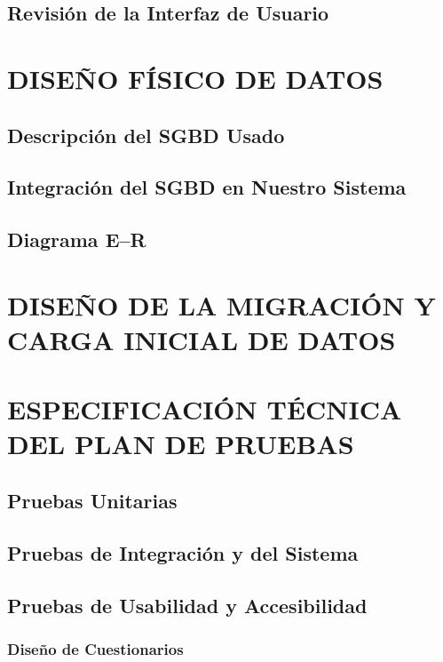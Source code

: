 \documentclass[11pt]{report} %
\begin{document}
\subsection{Revisión de la Interfaz de Usuario}


\newpage
\section{DISEÑO FÍSICO DE DATOS}

\subsection{Descripción del SGBD Usado} 

\subsection{Integración del SGBD en Nuestro Sistema} 

\subsection{Diagrama E--R} 


\newpage
\section{DISEÑO DE LA MIGRACIÓN Y CARGA INICIAL DE DATOS}


\newpage
\section{ESPECIFICACIÓN TÉCNICA DEL PLAN DE PRUEBAS}

\subsection{Pruebas Unitarias} 

\subsection{Pruebas de Integración y del Sistema} 

\subsection{Pruebas de Usabilidad y Accesibilidad} 

\subsubsection{Diseño de Cuestionarios} 
\end{document}
